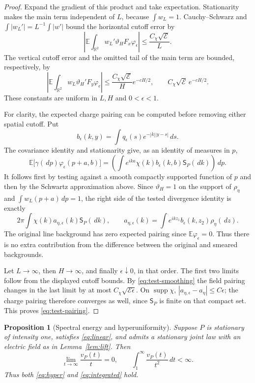 \documentclass[11pt,reqno]{amsart}
\numberwithin{equation}{section}
\newtheorem{proposition}[theorem]{Proposition}
\theoremstyle{definition}
\theoremstyle{remark}
\newcommand{\R}{\mathbb R}
\newcommand{\E}{\mathbb E}
\newcommand{\1}{\mathbf 1}
\newcommand{\Spec}{\mathsf S_P}
\newcommand{\dd}{\,d}
\newcommand{\calE}{\mathcal E}
\begin{document}
\begin{proof}
Expand the gradient of this product and take expectation. Stationarity
makes the main term independent of $L$, because $\int w_L=1$.
Cauchy--Schwarz and $\int|w_L'|=L^{-1}\int|w'|$ bound the horizontal
cutoff error by
\[
\left|\E\int_{\R^2}w_L'\vartheta_H F_x\varphi_\epsilon\right|
\le \frac{C_\chi\sqrt{\calE}}{L}.
\]
The vertical cutoff error and the omitted tail of the main term are
bounded, respectively, by
\[
\left|\E\int_{\R^2}w_L\vartheta_H' F_y\varphi_\epsilon\right|
\le\frac{C_\chi\sqrt{\calE}}{H}e^{-cH/2},
\qquad
C_\chi\sqrt{\calE}\,e^{-cH/2}.
\]
These constants are uniform in $L,H$ and $0<\epsilon<1$.

For clarity, the expected charge pairing can be computed before
removing either spatial cutoff. Put
\[
b_\epsilon(k,y)=
\int q_\epsilon(s)e^{-|k||y-s|}\dd s.
\]
The covariance identity and stationarity give, as an identity of
measures in $p$,
\[
\E\bigl[\gamma(\dd p)\varphi_\epsilon(p+a,b)\bigr]
=\left(\int e^{ika}\chi(k)b_\epsilon(k,b)\Spec(\dd k)\right)\dd p.
\]
It follows first by testing against a smooth compactly supported
function of $p$ and then by the Schwartz approximation above. Since
$\vartheta_H=1$ on the support of $\rho_\eta$ and $\int w_L(p+a)\dd p=1$,
the right side of the tested divergence identity is exactly
\[
2\pi\int\chi(k)a_{\eta,\epsilon}(k)\Spec(\dd k),
\qquad
a_{\eta,\epsilon}(k)=
\int e^{ikz_1}b_\epsilon(k,z_2)\rho_\eta(\dd z).
\]
The original line background has zero expected pairing since
$\E\varphi_\epsilon=0$. Thus there is no extra contribution from
the difference between the original and smeared backgrounds.

Let $L\to\infty$, then $H\to\infty$, and finally
$\epsilon\downarrow0$, in that order. The first two limits follow
from the displayed cutoff bounds. By \eqref{eq:test-smoothing} the
field pairing changes in the last limit by at most
$C_\chi\sqrt{\calE\epsilon}$. On $\operatorname{supp}\chi$,
$|a_{\eta,\epsilon}-a_\eta|\le C\epsilon$; the charge pairing
therefore converges as well, since $\Spec$ is finite on that compact set.
This proves \eqref{eq:test-pairing}.
\end{proof}

\begin{samepage}
\begin{proposition}[Spectral energy and hyperuniformity]
\label{prop:spectral}
Suppose $P$ is stationary of intensity one, satisfies
\eqref{eq:linear}, and admits a stationary joint law with an electric field as in
Lemma~\ref{lem:lift}. Then
\begin{equation}\label{eq:spectral-variance-conclusions}
\lim_{t\to\infty}\frac{v_P(t)}t=0,
\qquad \int_1^\infty\frac{v_P(t)}{t^2}\dd t<\infty.
\end{equation}
Thus both \eqref{eq:hyper} and \eqref{eq:integrated} hold.
\end{proposition}
\end{samepage}
\end{document}
